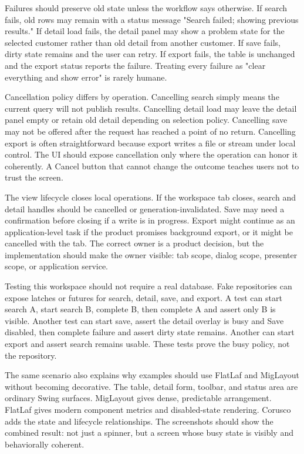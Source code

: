 Failures should preserve old state unless the workflow says otherwise. If
search fails, old rows may remain with a status message "Search failed; showing
previous results." If detail load fails, the detail panel may show a problem
state for the selected customer rather than old detail from another customer.
If save fails, dirty state remains and the user can retry. If export fails, the
table is unchanged and the export status reports the failure. Treating every
failure as "clear everything and show error" is rarely humane.

Cancellation policy differs by operation. Cancelling search simply means the
current query will not publish results. Cancelling detail load may leave the
detail panel empty or retain old detail depending on selection policy.
Cancelling save may not be offered after the request has reached a point of no
return. Cancelling export is often straightforward because export writes a file
or stream under local control. The UI should expose cancellation only where the
operation can honor it coherently. A Cancel button that cannot change the
outcome teaches users not to trust the screen.

The view lifecycle closes local operations. If the workspace tab closes, search
and detail handles should be cancelled or generation-invalidated. Save may need
a confirmation before closing if a write is in progress. Export might continue
as an application-level task if the product promises background export, or it
might be cancelled with the tab. The correct owner is a product decision, but
the implementation should make the owner visible: tab scope, dialog scope,
presenter scope, or application service.

Testing this workspace should not require a real database. Fake repositories
can expose latches or futures for search, detail, save, and export. A test can
start search A, start search B, complete B, then complete A and assert only B
is visible. Another test can start save, assert the detail overlay is busy and
Save disabled, then complete failure and assert dirty state remains. Another
can start export and assert search remains usable. These tests prove the busy
policy, not the repository.

The same scenario also explains why examples should use FlatLaf and MigLayout
without becoming decorative. The table, detail form, toolbar, and status area
are ordinary Swing surfaces. MigLayout gives dense, predictable arrangement.
FlatLaf gives modern component metrics and disabled-state rendering. Corusco
adds the state and lifecycle relationships. The screenshots should show
the combined result: not just a spinner, but a screen whose busy state is
visibly and behaviorally coherent.

